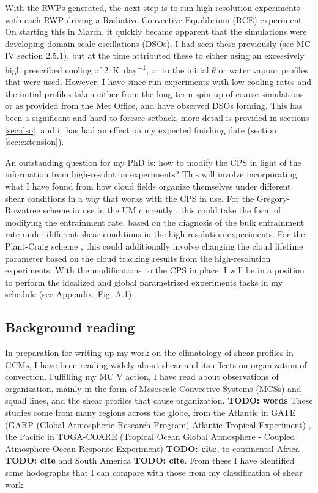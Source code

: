 \documentclass[11pt,a4paper]{article}
\newcommand\todo[1]{\textbf{TODO: #1}}
\begin{document}
With the RWPs generated, the next step is to run high-resolution experiments with each RWP driving a Radiative-Convective Equilibrium (RCE) experiment. On starting this in March, it quickly became apparent that the simulations were developing domain-scale oscillations (DSOs). I had seen these previously (see MC IV section 2.5.1), but at the time attributed these to either using an excessively high prescribed cooling of \SI{2}{K.day^{-1}}, or to the initial $\theta$ or water vapour profiles that were used. However, I have since run experiments with low cooling rates and the initial profiles taken either from the long-term spin up of coarse simulations or as provided from the Met Office, and have observed DSOs forming. This has been a significant and hard-to-foresee setback, more detail is provided in sections \ref{sec:dso}, and it has had an effect on my expected finishing date (section \ref{sec:extension}).

An outstanding question for my PhD is: how to modify the CPS in light of the information from high-resolution experiments? This will involve incorporating what I have found from how cloud fields organize themselves under different shear conditions in a way that works with the CPS in use. For the Gregory-Rowntree scheme in use in the UM currently \parencite{gregory1990mass}, this could take the form of modifying the entrainment rate, based on the diagnosis of the bulk entrainment rate under different shear conditions in the high-resolution experiments. For the Plant-Craig scheme \parencite{plant2008stochastic}, this could additionally involve changing the cloud lifetime parameter based on the cloud tracking results from the high-resolution experiments. With the modifications to the CPS in place, I will be in a position to perform the idealized and global parametrized experiments tasks in my schedule (see Appendix, Fig. A.1).

\subsection{Background reading}
\label{sec:Background reading}

In preparation for writing up my work on the climatology of shear profiles in GCMs, I have been reading widely about shear and its effects on organization of convection. Fulfilling my MC V action, I have read about observations of organization, mainly in the form of Mesoscale Convective Systems (MCSs) and squall lines, and the shear profiles that cause organization. \todo{words} These studies come from many regions across the globe, from the Atlantic in GATE (GARP (Global Atmospheric Research Program) Atlantic Tropical Experiment) \parencite{houze1977structure, zipser1977}, the Pacific in TOGA-COARE (Tropical Ocean Global Atmosphere - Coupled Atmosphere-Ocean Response Experiment) \todo{cite}, to continental Africa \todo{cite} and South America \todo{cite}. From these I have identified some hodographs that I can compare with those from my classification of shear work. 
\end{document}
